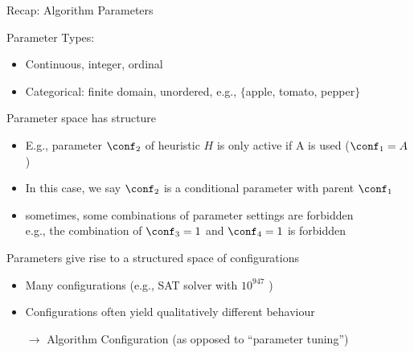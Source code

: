 \begin{frame}[c]{Recap: Algorithm Parameters}

Parameter Types:
\begin{itemize}
  \item Continuous, integer, ordinal
  \item \alert{Categorical}: finite domain, unordered, e.g., $\{$apple, tomato, pepper$\}$
\end{itemize}

\medskip
\pause

Parameter space has structure
\begin{itemize}
  \item E.g., parameter $\conf_2$ of heuristic $H$ is only active if A is used ($\conf_1 = A$)
  \item In this case, we say $\conf_2$ is a \alert{conditional parameter} with parent $\conf_1$
  \smallskip
  \item sometimes, some combinations of parameter settings are forbidden\\
  		e.g., the combination of $\conf_3 = 1$ and $\conf_4 = 1$ is forbidden 
\end{itemize}

\medskip
\pause

Parameters give rise to a structured space of configurations
\begin{itemize}
  \item Many configurations (e.g., SAT solver \lingeling{} with $10^{947}$ )
  \item Configurations often yield \alert{qualitatively different behaviour}
  \item[$\to$] Algorithm Configuration (as opposed to ``parameter tuning'')
\end{itemize}

\end{frame}

